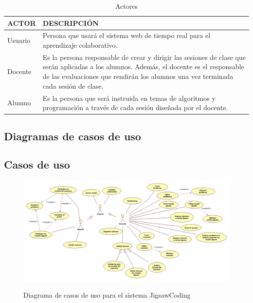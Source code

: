 \begin{longtable}{L{3cm}L{7cm}}
\caption{Actores}
\label{tab:actores}\\
    \toprule[0.8mm]
    ACTOR & DESCRIPCIÓN \\
    \midrule[0.6mm]
    Usuario & Persona que usará el sistema web de tiempo real para el aprendizaje colaborativo.\\
    \midrule
    Docente & Es la persona responsable de crear y dirigir las sesiones de clase que serán aplicadas a los alumnos. Además, el docente es el responsable de las evaluaciones que rendirán los alumnos una vez terminada cada sesión de clase.\\
    \midrule
    Alumno & Es la persona que será instruida en temas de algoritmos y programación a través de cada sesión diseñada por el docente.\\
    \bottomrule[0.8mm]
\end{longtable}
\clearpage
\begin{landscape}
\section{Diagramas de casos de uso}
\subsection{Casos de uso}
\begin{figure}[!h]
  \centering
  \includegraphics[scale=0.45]{figuras/casosdeuso/casos_de_uso.jpg}\\
  \caption[Casos de uso]{Diagrama de casos de uso para el sistema JigsawCoding}
  \label{fig:casos_de_uso}
\end{figure}
\end{landscape}
\clearpage

